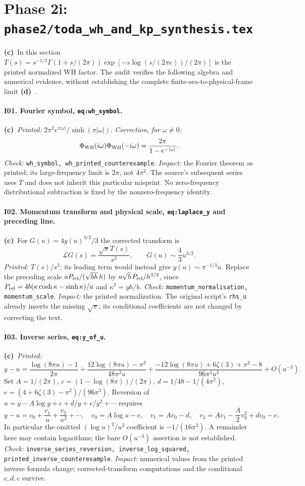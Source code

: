\documentclass[11pt,a4paper]{article}
\newcommand{\C}{\textbf{(c)}\ }
\newcommand{\D}{\textbf{(d)}\ }
\newcommand{\file}[1]{\nolinkurl{#1}}
\newcommand{\test}[1]{\textit{Check:} \file{#1}.}
\begin{document}
\section{Phase 2i: \file{phase2/toda_wh_and_kp_synthesis.tex}}
\noindent\C In this section $T(s)=s^{-1/2}\Gamma(1+s/(2\pi))
\exp[-s\log(s/(2\pi e))/(2\pi)]$ is the printed normalized WH factor.
The audit verifies the following algebra and numerical evidence, without
establishing the complete finite-sea-to-physical-frame limit \D.

\paragraph{I01. Fourier symbol, \file{eq:wh_symbol}.}
\C \textit{Printed:} $2\pi^2e^{\pi|\omega|}/\sinh(\pi|\omega|)$.
\textit{Correction, for $\omega\ne0$:}
\[
 \Phi_{\rm WH}(i\omega)\Phi_{\rm WH}(-i\omega)
 =\frac{2\pi}{1-e^{-|\omega|}}.
\]
\test{wh_symbol, wh_printed_counterexample}
\textit{Impact:} the Fourier theorem as printed; its large-frequency limit
is $2\pi$, not $4\pi^2$. The source's subsequent series uses $T$ and does
not inherit this particular misprint. No zero-frequency distributional
subtraction is fixed by the nonzero-frequency identity.

\paragraph{I02. Momentum transform and physical scale, \file{eq:laplace_y} and preceding line.}
\C For $G(u)=4y(u)^{3/2}/3$ the corrected transform is
\[
 \mathcal LG(s)=\frac{\sqrt\pi T(s)}{s^2},
 \qquad G(u)\sim\frac43u^{3/2}.
\]
\textit{Printed:} $T(s)/s^2$; its leading term would instead give
$y(u)\sim\pi^{-1/3}u$. Replace the preceding scale
$aP_{\rm rel}/(\sqrt{bh}\,h)$ by
$a\sqrt b\,P_{\rm rel}/h^{3/2}$, since
$P_{\rm rel}=4b(\kappa\cosh\kappa-\sinh\kappa)/a$ and
$\kappa^2=yh/b$.
\test{momentum_normalisation, momentum_scale}
\textit{Impact:} the printed normalization. The original script's
\file{rhs_u} already inserts the missing $\sqrt\pi$; its conditional
coefficients are not changed by correcting the text.

\paragraph{I03. Inverse series, \file{eq:y_of_u}.}
\C \textit{Printed:}
\[
 y-u=\frac{\log(8\pi u)-1}{2\pi}
 +\frac{12\log(8\pi u)-\pi^2}{48\pi^2u}
 +\frac{-12\log(8\pi u)+6\zeta(3)+\pi^2-8}{96\pi^3u^2}+O(u^{-3}).
\]
Set $A=1/(2\pi)$, $c=(1-\log(8\pi))/(2\pi)$,
$d=1/48-1/(4\pi^2)$, $e=(4+6\zeta(3)-\pi^2)/(96\pi^3)$.
Reversion of $u=y-A\log y+c+d/y+e/y^2+\cdots$ requires
\[
 y-u=v_0+\frac{v_1}{u}+\frac{v_2}{u^2}+\cdots,
 \quad v_0=A\log u-c,\quad v_1=Av_0-d,
 \quad v_2=Av_1-\frac A2v_0^2+dv_0-e.
\]
In particular the omitted $(\log u)^2/u^2$ coefficient is
$-1/(16\pi^3)$. A remainder here may contain logarithms; the bare
$O(u^{-3})$ assertion is not established.
\test{inverse_series_reversion, inverse_log_squared, printed_inverse_counterexample}
\textit{Impact:} numerical values from the printed inverse formula change;
corrected-transform computations and the conditional $c,d,e$ survive.
\end{document}
